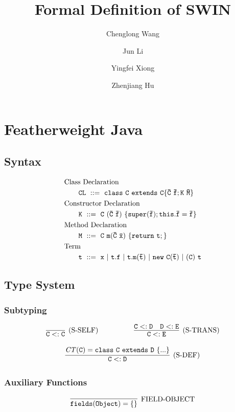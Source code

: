 \documentclass[letterpaper]{article}
\begin{document}
\title{Formal Definition of SWIN}
\author{Chenglong Wang \and Jun Li \and Yingfei Xiong \and Zhenjiang Hu}
\date{}
\maketitle

\section{Featherweight Java}
\subsection{Syntax}
\begin{align*}
  & \mbox{Class Declaration}\\
  & \qquad\tt CL\ ::=\  \tt class\ C\ extends\ C \{\bar{C}\ \bar{f}; K\ \bar{M}\}\\
  & \mbox{Constructor Declaration}\\
  & \qquad\tt K \ ::=\  \tt C\ (\bar{C}\ \bar{f})\ \{ super(\bar{f}); this.\bar{f}=\bar{f}\}\\
  & \mbox{Method Declaration}\\
  & \qquad\tt M \ ::=\  \tt C\ m(\bar{C}\ \bar{x})\ \{ return\ t;\}\\
  & \mbox{Term}\\
  & \qquad\tt t \ ::=\  \tt x\ |\ t.f\ |\ t.m(\bar{t})\ |\ new\ C(\bar{t})\ |\ (C)\ t
\end{align*}
\subsection{Type System}
\subsubsection{Subtyping}
\[
\begin{array}{c c}
\infer[\text{(S-SELF)}]
  {\tt C<:C}
  {}
~~~~~~~~~~~~~~~
\infer[\text{(S-TRANS)}]
  {\tt C<:E}
  {\tt C<:D
  &\tt D<:E
  }
\end{array}
\]

\[
\begin{array}{c}

\infer[\text{(S-DEF)}]
  {\tt C<:D}
  {\tt \mathit{CT}(C)=class~C~extends~D~\{...\}
  }

\end{array}
\]

\subsubsection{Auxiliary Functions}
\[
  \begin{array}{c}
    \infer[\text{FIELD-OBJECT}]
    {\tt fields(Object)=\{\}}
    {}
  \end{array}
\]
\end{document}
